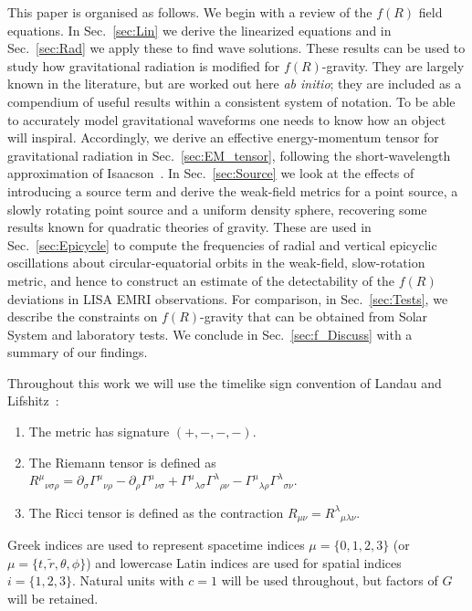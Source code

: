 \documentclass[aps,prd,amsfonts,amssymb,amsmath,nofootinbib,reprint,showpacs]{revtex4-1}
\newcommand{\secref}[1]{Sec.\ \ref{sec:#1}}
\begin{document}
This paper is organised as follows. We begin with a review of the $f(R)$ field equations. In \secref{Lin} we derive the linearized equations and in \secref{Rad} we apply these to find wave solutions. These results can be used to study how gravitational radiation is modified for $f(R)$-gravity. They are largely known in the literature, but are worked out here {\it ab initio}; they are included as a compendium of useful results within a consistent system of notation. To be able to accurately model gravitational waveforms one needs to know how an object will inspiral. Accordingly, we derive an effective energy-momentum tensor for gravitational radiation in \secref{EM_tensor}, following the short-wavelength approximation of Isaacson~\cite{Isaacson1968, Isaacson1968a}. In \secref{Source} we look at the effects of introducing a source term and derive the weak-field metrics for a point source, a slowly rotating point source and a uniform density sphere, recovering some results known for quadratic theories of gravity. These are used in \secref{Epicycle} to compute the frequencies of radial and vertical epicyclic oscillations about circular-equatorial orbits in the weak-field, slow-rotation metric, and hence to construct an estimate of the detectability of the $f(R)$ deviations in LISA EMRI observations. For comparison, in \secref{Tests}, we describe the constraints on $f(R)$-gravity that can be obtained from Solar System and laboratory tests. We conclude in \secref{f_Discuss} with a summary of our findings.

Throughout this work we will use the timelike sign convention of Landau and Lifshitz~\cite{Landau1975}:
\begin{enumerate}
\item The metric has signature $(+,-,-,-)$.
\item The Riemann tensor is defined as ${R^\mu}_{\nu\sigma\rho} = \partial_\sigma {\Gamma^\mu}_{\nu\rho} - \partial_\rho {\Gamma^\mu}_{\nu\sigma} + {\Gamma^\mu}_{\lambda\sigma}{\Gamma^\lambda}_{\rho\nu} - {\Gamma^\mu}_{\lambda\rho}{\Gamma^\lambda}_{\sigma\nu}$.
\item The Ricci tensor is defined as the contraction $R_{\mu\nu} = {R^\lambda}_{\mu\lambda\nu}$.
\end{enumerate}
Greek indices are used to represent spacetime indices $\mu = \{0,1,2,3\}$ (or $\mu = \{t,\widetilde{r},\theta,\phi\}$) and lowercase Latin indices are used for spatial indices $i = \{1,2,3\}$. Natural units with $c = 1$ will be used throughout, but factors of $G$ will be retained.
\end{document}
